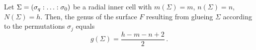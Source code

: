 \begin{cor}
\label{cellular_models:radial:h_m_n_g_are_recognized}
    Let $\Sigma = \homogq$ be a radial inner cell with $m(\Sigma) = m$, $n(\Sigma) = n$, $N(\Sigma) = h$.
    Then, the genus of the surface $F$ resulting from glueing $\Sigma$ according to the permutations $\sigma_j$ equals
    \[
       g(\Sigma) = \frac{h - m - n + 2}{2}\,. 
    \]
\end{cor}
